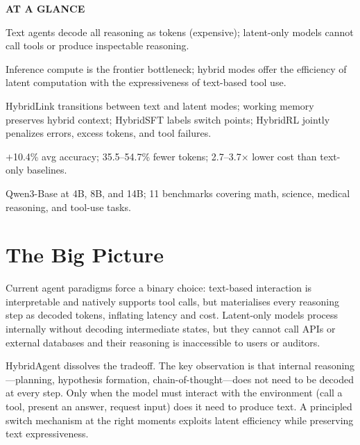 \documentclass[10pt,twocolumn]{article}
\begin{document}
\begin{mdframed}[backgroundcolor=boxgray,linecolor=rulered,linewidth=1pt,
    innerleftmargin=6pt,innerrightmargin=6pt,
    innertopmargin=6pt,innerbottommargin=6pt]
\textbf{\small AT A GLANCE}\par\vspace{4pt}
\begin{description}[leftmargin=0pt,labelsep=4pt,itemsep=2pt,parsep=0pt,
    font=\small\bfseries]
  \item[Problem:] Text agents decode all reasoning as tokens (expensive);
    latent-only models cannot call tools or produce inspectable reasoning.
  \item[Why it matters:] Inference compute is the frontier bottleneck;
    hybrid modes offer the efficiency of latent computation with the
    expressiveness of text-based tool use.
  \item[Method:] HybridLink transitions between text and latent modes;
    working memory preserves hybrid context; HybridSFT labels switch
    points; HybridRL jointly penalizes errors, excess tokens, and tool
    failures.
  \item[Result:] $+$10.4\% avg accuracy; 35.5--54.7\% fewer tokens;
    2.7--3.7$\times$ lower cost than text-only baselines.
  \item[Evidence:] Qwen3-Base at 4B, 8B, and 14B; 11 benchmarks covering
    math, science, medical reasoning, and tool-use tasks.
\end{description}
\end{mdframed}

\section{The Big Picture}

Current agent paradigms force a binary choice: text-based interaction is
interpretable and natively supports tool calls, but materialises every
reasoning step as decoded tokens, inflating latency and cost. Latent-only
models process internally without decoding intermediate states, but they
cannot call APIs or external databases and their reasoning is inaccessible
to users or auditors.

HybridAgent dissolves the tradeoff. The key observation is that internal
reasoning---planning, hypothesis formation, chain-of-thought---does not
need to be decoded at every step. Only when the model must interact with
the environment (call a tool, present an answer, request input) does it
need to produce text. A principled switch mechanism at the right moments
exploits latent efficiency while preserving text expressiveness.
\end{document}
